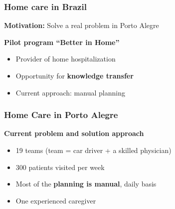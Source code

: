 \begin{frame}
   \frametitle{Home care in Brazil}

   \textbf{Motivation: } Solve a real problem in Porto Alegre

   \vspace{12pt}

   \textbf{Pilot program ``Better in Home''}
   \begin{itemize}
      \item Provider of home hospitalization
      \item Opportunity for \textbf{knowledge transfer}
      \item Current approach: manual planning
   \end{itemize}

\end{frame}

\begin{frame}
   \frametitle{Home Care in Porto Alegre}

   \textbf{Current problem and solution approach}
   \begin{itemize}
      \item 19 teams (team = car driver + a skilled physician)
      \item 300 patients visited per week
      \item Most of the \textbf{planning is manual}, daily basis
      \item One experienced caregiver
   \end{itemize}


\end{frame}

